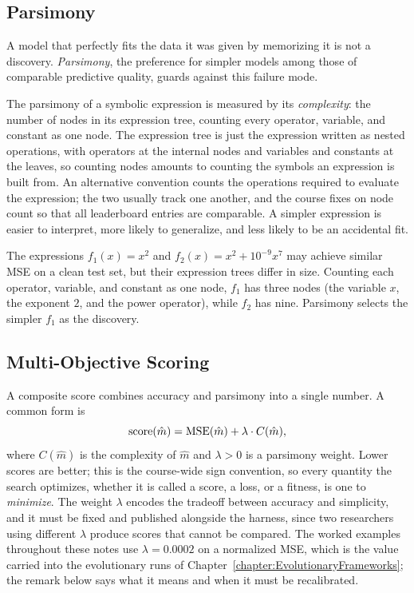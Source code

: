 \subsection{Parsimony}
\label{subsection:Parsimony}

A model that perfectly fits the data it was given by memorizing it is not a discovery.
\emph{Parsimony}, the preference for simpler models among those of comparable predictive quality, guards against this failure mode.

The parsimony of a symbolic expression is measured by its \emph{complexity}: the number of nodes in its expression tree, counting every operator, variable, and constant as one node.
The expression tree is just the expression written as nested operations, with operators at the internal nodes and variables and constants at the leaves, so counting nodes amounts to counting the symbols an expression is built from.
An alternative convention counts the operations required to evaluate the expression; the two usually track one another, and the course fixes on node count so that all leaderboard entries are comparable.
A simpler expression is easier to interpret, more likely to generalize, and less likely to be an accidental fit.

\begin{example}
The expressions $f_1(x) = x^2$ and $f_2(x) = x^2 + 10^{-9} x^7$ may achieve similar MSE on a clean test set, but their expression trees differ in size.
Counting each operator, variable, and constant as one node, $f_1$ has three nodes (the variable $x$, the exponent $2$, and the power operator), while $f_2$ has nine.
Parsimony selects the simpler $f_1$ as the discovery.
\end{example}

\subsection{Multi-Objective Scoring}
\label{subsection:MultiObjectiveScoring}

A composite score combines accuracy and parsimony into a single number.
A common form is
\begin{equation}
\mathrm{score}(\hat{m}) = \mathrm{MSE}(\hat{m}) + \lambda \cdot C(\hat{m}) ,
\label{equation:CompositeScore}
\end{equation}
where $C(\hat{m})$ is the complexity of $\hat{m}$ and $\lambda > 0$ is a parsimony weight.
Lower scores are better; this is the course-wide sign convention, so every quantity the search optimizes, whether it is called a score, a loss, or a fitness, is one to \emph{minimize}.
The weight $\lambda$ encodes the tradeoff between accuracy and simplicity, and it must be fixed and published alongside the harness, since two researchers using different $\lambda$ produce scores that cannot be compared.
The worked examples throughout these notes use $\lambda = 0.0002$ on a normalized MSE, which is the value carried into the evolutionary runs of Chapter~\ref{chapter:EvolutionaryFrameworks}; the remark below says what it means and when it must be recalibrated.

